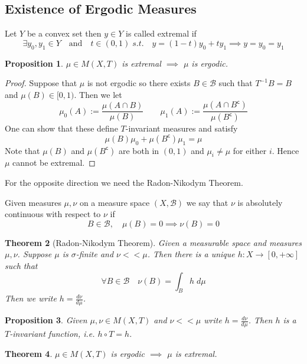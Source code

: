\documentclass[11pt]{article}
\newcommand{\defeq}{:=}
\newcommand{\stcmp}{^{\mathsf{c}}}
\newenvironment{defin}
	{\begin{mdframed}[backgroundcolor=white, roundcorner=5pt, linewidth=1pt, linecolor=RoyalBlue]}
	{\end{mdframed}}
\newcommand{\mdf}[1]{{\color{RoyalBlue} #1}}
\newtheorem{prop}{Proposition}[section]
\newtheorem{theorem}[prop]{Theorem}
\begin{document}
\subsection{Existence of Ergodic Measures}
\begin{defin}
 Let $Y$ be a convex set then $y\in Y$ is called \mdf{extremal} if
 \[
 \exists y_0, y_1 \in Y \quad \text{and} \quad t\in (0, 1)\; s.t. \quad y = (1-t)y_0 + ty_1 \implies y=y_0=y_1
 \]
\end{defin}

\begin{prop}
$\mu\in M(X, T)$ is extremal $\implies$ $\mu$ is ergodic.
\end{prop}

\begin{proof}
Suppose that $\mu$ is not ergodic so there exists $B\in\mathcal{B}$ such that $T^{-1}B = B$ and $\mu(B)\in [0, 1)$.
Then we let
\[
\mu_0(A)\defeq\frac{\mu(A\cap B)}{\mu(B)} \quad \quad \mu_1(A)\defeq\frac{\mu(A\cap B\stcmp)}{\mu(B\stcmp)}
\]
One can show that these define $T$-invariant measures and satisfy
\[
	\mu(B)\mu_0 + \mu(B\stcmp)\mu_1 = \mu
\]
Note that $\mu(B)$ and $\mu(B\stcmp)$ are both in $(0, 1)$ and $\mu_i\neq \mu$ for either $i$.
Hence $\mu$ cannot be extremal.
\end{proof}

For the opposite direction we need the Radon-Nikodym Theorem.

\begin{defin}
	Given measures $\mu, \nu$ on a measure space $(X, \mathcal{B})$	we say that $\nu$ is \mdf{absolutely continuous} with respect to $\nu$ if
	\[
		B\in\mathcal{B}, \quad \mu(B) = 0 \implies \nu(B) = 0
	\]
\end{defin}

\begin{theorem}[Radon-Nikodym Theorem]
Given a measurable space and measures $\mu, \nu$.
Suppose $\mu$ is $\sigma$-finite and $\nu << \mu$.
Then there is a unique $h:X\to [0, +\infty]$ such that
\[
	\forall B\in \mathcal{B} \quad \nu(B) = \int_B h \; d\mu
\]
Then we write $h=\frac{d\nu}{d\mu}$.
\end{theorem}

\begin{prop}
Given $\mu, \nu\in M(X, T)$ and $\nu << \mu$ write $h=\frac{d\nu}{d\mu}$.
Then $h$ is a $T$-invariant function, i.e. $h \circ T = h$.
\end{prop}

\begin{theorem}
$\mu \in M(X, T)$ is ergodic $\implies$ $\mu$ is extremal.
\end{theorem}
\end{document}
